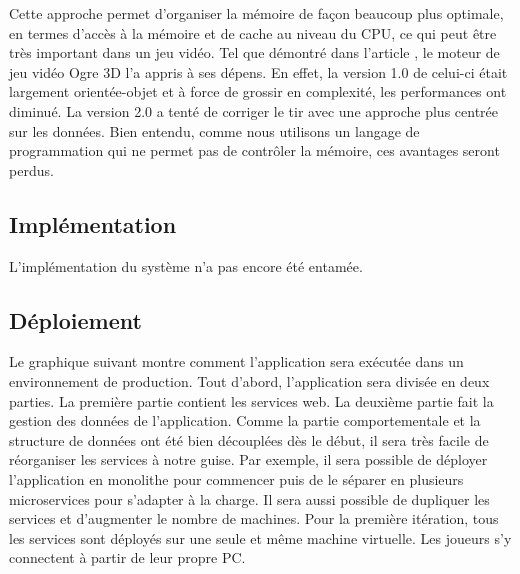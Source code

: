 \documentclass[12pt]{article}
\begin{document}


Cette approche permet d'organiser la mémoire de façon beaucoup plus optimale, en termes d'accès à la mémoire et de cache au niveau du CPU, ce qui peut être très important dans un jeu vidéo. Tel que démontré dans l'article \cite{DOD_Game_Engine}, le moteur de jeu vidéo Ogre 3D l'a appris à ses dépens. En effet, la version 1.0 de celui-ci était largement orientée-objet et à force de grossir en complexité, les performances ont diminué. La version 2.0 a tenté de corriger le tir avec une approche plus centrée sur les données. Bien entendu, comme nous utilisons un langage de programmation qui ne permet pas de contrôler la mémoire, ces avantages seront perdus.

\subsection{Implémentation}

L'implémentation du système n'a pas encore été entamée.

\subsection{Déploiement}

Le graphique suivant montre comment l'application sera exécutée dans un environnement de production. Tout d'abord, l'application sera divisée en deux parties. La première partie contient les services web. La deuxième partie fait la gestion des données de l'application. Comme la partie comportementale et la structure de données ont été bien découplées dès le début, il sera très facile de réorganiser les services à notre guise. Par exemple, il sera possible de déployer l'application en monolithe pour commencer puis de le séparer en plusieurs microservices pour s'adapter à la charge. Il sera aussi possible de dupliquer les services et d'augmenter le nombre de machines. Pour la première itération, tous les services sont déployés sur une seule et même machine virtuelle. Les joueurs s'y connectent à partir de leur propre PC.
\end{document}
